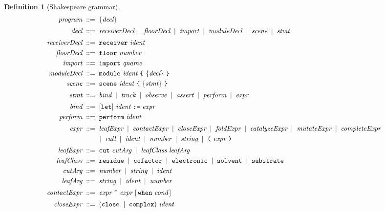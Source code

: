 \documentclass[11pt,a4paper]{article}
\theoremstyle{thmstyle}
\theoremstyle{definition}
\newtheorem{definition}[theorem]{Definition}
\theoremstyle{remark}
\newcommand{\bnf}{\;::=\;}
\newcommand{\alt}{\;\mid\;}
\newcommand{\shk}[1]{\texttt{#1}}
\begin{document}
\begin{definition}[Shakespeare grammar]
\label{def:grammar}
\begin{align*}
\textit{program} &\bnf \{\textit{decl}\} \\[2pt]
\textit{decl} &\bnf \textit{receiverDecl} \alt \textit{floorDecl}
   \alt \textit{import} \alt \textit{moduleDecl} \alt \textit{scene}
   \alt \textit{stmt} \\[2pt]
\textit{receiverDecl} &\bnf \shk{receiver}\ \textit{ident} \\
\textit{floorDecl} &\bnf \shk{floor}\ \textit{number} \\
\textit{import} &\bnf \shk{import}\ \textit{qname} \\
\textit{moduleDecl} &\bnf \shk{module}\ \textit{ident}\ \shk{\{}\
   \{\textit{decl}\}\ \shk{\}} \\
\textit{scene} &\bnf \shk{scene}\ \textit{ident}\ \shk{\{}\
   \{\textit{stmt}\}\ \shk{\}} \\[2pt]
\textit{stmt} &\bnf \textit{bind} \alt \textit{track} \alt \textit{observe}
   \alt \textit{assert} \alt \textit{perform} \alt \textit{expr} \\[2pt]
\textit{bind} &\bnf [\shk{let}]\ \textit{ident}\ \shk{:=}\ \textit{expr} \\
\textit{perform} &\bnf \shk{perform}\ \textit{ident} \\[2pt]
\textit{expr} &\bnf \textit{leafExpr} \alt \textit{contactExpr}
   \alt \textit{closeExpr} \alt \textit{foldExpr}
   \alt \textit{catalyzeExpr} \alt \textit{mutateExpr}
   \alt \textit{completeExpr} \\
   &\qquad \alt \textit{call} \alt \textit{ident} \alt \textit{number}
   \alt \textit{string} \alt \shk{(}\ \textit{expr}\ \shk{)} \\[2pt]
\textit{leafExpr} &\bnf \shk{cut}\ \textit{cutArg}
   \alt \textit{leafClass}\ \textit{leafArg} \\
\textit{leafClass} &\bnf \shk{residue} \alt \shk{cofactor}
   \alt \shk{electronic} \alt \shk{solvent} \alt \shk{substrate} \\
\textit{cutArg} &\bnf \textit{number} \alt \textit{string}
   \alt \textit{ident} \\
\textit{leafArg} &\bnf \textit{string} \alt \textit{ident}
   \alt \textit{number} \\[2pt]
\textit{contactExpr} &\bnf \textit{expr}\ \shk{\~{}}\ \textit{expr}\
   [\,\shk{when}\ \textit{cond}\,] \\[2pt]
\textit{closeExpr} &\bnf (\shk{close}\alt\shk{complex})\ \textit{ident}\

\end{align*}
\end{definition}
\end{document}
